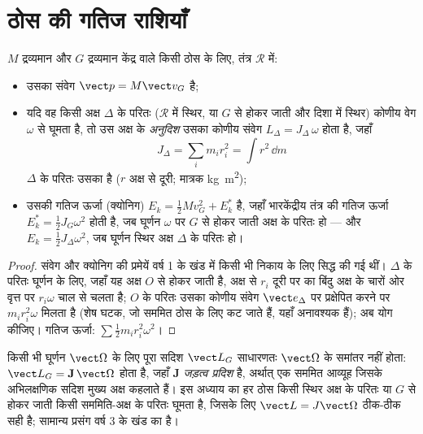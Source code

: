 \section{ठोस की गतिज राशियाँ}

\begin{proposition}[संवेग, कोणीय संवेग, गतिज ऊर्जा]\label{prop:b2:rigid-body-mechanics:kinetic}
$M$ द्रव्यमान और $G$ द्रव्यमान केंद्र वाले किसी ठोस के लिए, तंत्र $\mathcal R$ में:
\begin{itemize}
  \item उसका संवेग $\vect p = M\vect v_G$ है;
  \item यदि वह किसी अक्ष $\Delta$ के परितः ($\mathcal R$ में स्थिर, या
        $G$ से होकर जाती और दिशा में स्थिर) कोणीय वेग
        $\omega$ से घूमता है, तो उस अक्ष के \emph{अनुदिश} उसका कोणीय संवेग
        $L_\Delta = J_\Delta\,\omega$ होता है, जहाँ
        \[
        J_\Delta = \sum_i m_i r_i^2 = \int r^2\,\dd m
        \]
        $\Delta$ के परितः उसका \emph{} है ($r$ अक्ष से दूरी;
        मात्रक \unit{kg.m^2});
  \item उसकी गतिज ऊर्जा (क्योनिग) $E_k = \tfrac12Mv_G^2 +
        E_k^*$ है, जहाँ भारकेंद्रीय तंत्र की गतिज ऊर्जा
        $E_k^* = \tfrac12J_{G}\omega^2$ होती है, जब घूर्णन $\omega$ पर
        $G$ से होकर जाती अक्ष के परितः हो --- और $E_k = \tfrac12J_\Delta\omega^2$,
        जब घूर्णन स्थिर अक्ष $\Delta$ के परितः हो।
\end{itemize}
\end{proposition}

\begin{proof}
संवेग और क्योनिग की प्रमेयें वर्ष 1 के खंड में किसी भी निकाय के लिए
सिद्ध की गई थीं। $\Delta$ के परितः घूर्णन के लिए, जहाँ यह अक्ष $O$ से होकर
जाती है, अक्ष से $r_i$ दूरी पर का बिंदु अक्ष के चारों ओर वृत्त पर $r_i\omega$ चाल से चलता
है; $O$ के परितः उसका कोणीय संवेग $\vect e_\Delta$ पर प्रक्षेपित करने पर
$m_ir_i^2\omega$ मिलता है (शेष घटक, जो सममित ठोस के लिए कट जाते हैं, यहाँ
अनावश्यक हैं); अब योग कीजिए। गतिज ऊर्जा: $\sum\tfrac12m_ir_i^2
\omega^2$।
\end{proof}

\begin{remark}[क्या स्वीकृत है]\label{rem:b2:rigid-body-mechanics:tensor}
किसी भी घूर्णन $\vect\Omega$ के लिए पूरा सदिश $\vect L_G$ साधारणतः
$\vect\Omega$ के समांतर नहीं होता: $\vect L_G = \mathbf J\,\vect\Omega$
होता है, जहाँ $\mathbf J$ \emph{जड़त्व प्रदिश} है, अर्थात् एक सममित आव्यूह
जिसके अभिलक्षणिक सदिश मुख्य अक्ष कहलाते हैं। इस अध्याय का हर ठोस किसी
स्थिर अक्ष के परितः या $G$ से होकर जाती किसी सममिति-अक्ष के परितः घूमता
है, जिसके लिए $\vect L = J\vect\Omega$ ठीक-ठीक सही है; सामान्य प्रसंग
वर्ष 3 के खंड का है।
\end{remark}

